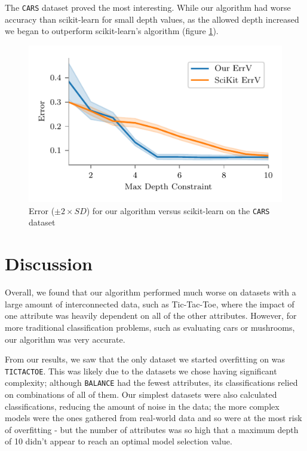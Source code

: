\documentclass[screen, authorversion, nonacm, sigconf]{acmart}
\begin{document}
The \texttt{CARS} dataset proved the most interesting. While our algorithm had worse accuracy than scikit-learn for small depth values, as the allowed depth increased we began to outperform scikit-learn's algorithm (figure \ref{fig:caroursvscikit}).

\begin{figure}
  \centering
  \includegraphics[width=\columnwidth]{figures/chart_ours_v_scikit_variance_car.pdf}
  \caption{Error ($\pm 2 \times SD$) for our algorithm versus scikit-learn on the \texttt{CARS} dataset}
  \label{fig:caroursvscikit}
\end{figure}

\section{Discussion}

Overall, we found that our algorithm performed much worse on datasets with a large amount of interconnected data, such as Tic-Tac-Toe, where the impact of one attribute was heavily dependent on all of the other attributes. However, for more traditional classification problems, such as evaluating cars or mushrooms, our algorithm was very accurate.

From our results, we saw that the only dataset we started overfitting on was \texttt{TICTACTOE}. This was likely due to the datasets we chose having significant complexity; although \texttt{BALANCE} had the fewest attributes, its classifications relied on combinations of all of them. Our simplest datasets were also calculated classifications, reducing the amount of noise in the data; the more complex models were the ones gathered from real-world data and so were at the most risk of overfitting - but the number of attributes was so high that a maximum depth of 10 didn't appear to reach an optimal model selection value.
\end{document}
